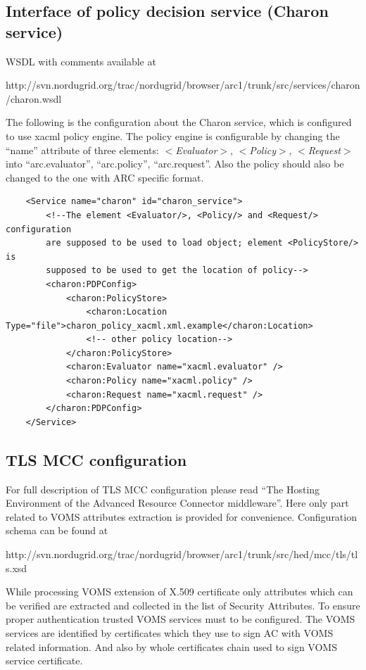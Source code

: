 \documentclass{article}                            %
\begin{document}
\subsection{Interface of policy decision service (Charon service)} %
\label{subsec:interface_pds}
WSDL with comments available at

http://svn.nordugrid.org/trac/nordugrid/browser/arc1/trunk/src/services/charon/charon.wsdl

The following is the configuration about the Charon service, which is configured to use xacml policy engine. The policy engine is configurable by changing the ``name'' attribute of three elements: \textit{$<$Evaluator$>$}, \textit{$<$Policy$>$}, \textit{$<$Request$>$} into ``arc.evaluator'', ``arc.policy'', ``arc.request''. Also the policy should also be changed to the one with ARC specific format.

\begin{verbatim}
    <Service name="charon" id="charon_service">
        <!--The element <Evaluator/>, <Policy/> and <Request/> configuration
        are supposed to be used to load object; element <PolicyStore/> is
        supposed to be used to get the location of policy-->
        <charon:PDPConfig>
            <charon:PolicyStore>
                <charon:Location Type="file">charon_policy_xacml.xml.example</charon:Location>
                <!-- other policy location-->
            </charon:PolicyStore>
            <charon:Evaluator name="xacml.evaluator" />
            <charon:Policy name="xacml.policy" />
            <charon:Request name="xacml.request" />
        </charon:PDPConfig>
    </Service>
\end{verbatim}

\subsection{TLS MCC configuration} %
\label{subsec:tlsmcc_conf}
For full description of TLS MCC configuration please read ``The Hosting Environment of the Advanced Resource Connector middleware''. Here only part related to VOMS attributes extraction is provided for convenience. Configuration schema can be found at

http://svn.nordugrid.org/trac/nordugrid/browser/arc1/trunk/src/hed/mcc/tls/tls.xsd

While processing VOMS extension of X.509 certificate only attributes which can be verified are extracted and collected in the list of Security Attributes. To ensure proper authentication trusted VOMS services must to be configured. The VOMS services are identified by certificates which they use to sign AC with VOMS related information. And also by whole certificates chain used to sign VOMS service certificate.
\end{document}

